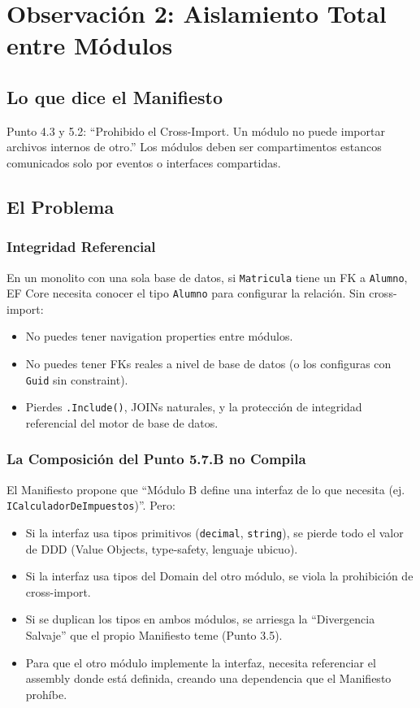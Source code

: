 \documentclass[12pt,a4paper]{article}
\begin{document}
\section{Observaci\'on 2: Aislamiento Total entre M\'odulos}

\subsection{Lo que dice el Manifiesto}
Punto 4.3 y 5.2: ``Prohibido el Cross-Import. Un m\'odulo no puede importar archivos internos de otro.'' Los m\'odulos deben ser compartimentos estancos comunicados solo por eventos o interfaces compartidas.

\subsection{El Problema}

\subsubsection{Integridad Referencial}
En un monolito con una sola base de datos, si \texttt{Matricula} tiene un FK a \texttt{Alumno}, EF Core necesita conocer el tipo \texttt{Alumno} para configurar la relaci\'on. Sin cross-import:
\begin{itemize}[leftmargin=2em]
    \item No puedes tener navigation properties entre m\'odulos.
    \item No puedes tener FKs reales a nivel de base de datos (o los configuras con \texttt{Guid} sin constraint).
    \item Pierdes \texttt{.Include()}, JOINs naturales, y la protecci\'on de integridad referencial del motor de base de datos.
\end{itemize}

\subsubsection{La Composici\'on del Punto 5.7.B no Compila}
El Manifiesto propone que ``M\'odulo B define una interfaz de lo que necesita (ej. \texttt{ICalculadorDeImpuestos})''. Pero:
\begin{itemize}[leftmargin=2em]
    \item Si la interfaz usa tipos primitivos (\texttt{decimal}, \texttt{string}), se pierde todo el valor de DDD (Value Objects, type-safety, lenguaje ubicuo).
    \item Si la interfaz usa tipos del Domain del otro m\'odulo, se viola la prohibici\'on de cross-import.
    \item Si se duplican los tipos en ambos m\'odulos, se arriesga la ``Divergencia Salvaje'' que el propio Manifiesto teme (Punto 3.5).
    \item Para que el otro m\'odulo implemente la interfaz, necesita referenciar el assembly donde est\'a definida, creando una dependencia que el Manifiesto proh\'ibe.
\end{itemize}
\end{document}
